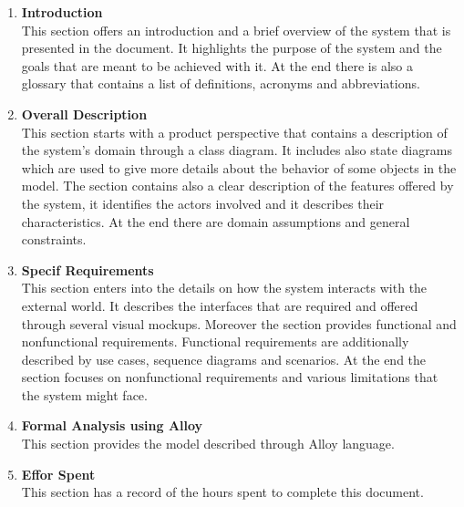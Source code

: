 \begin{enumerate}
    \item \textbf{Introduction}\\
            This section offers an introduction and a brief overview of the system that is presented in the document. 
            It highlights the purpose of the system and the goals that are meant to be achieved with it. 
            At the end there is also a glossary that contains a list of definitions, acronyms and abbreviations.
            
    \item \textbf{Overall Description}\\
            This section starts with a product perspective that contains a description of the system's domain through a class diagram. 
            It includes also state diagrams which are used to give more details about the behavior of some objects in the model.
            The section contains also a clear description of the features offered by the system, 
            it identifies the actors involved and it describes their characteristics.
            At the end there are domain assumptions and general constraints.
            
    
    \item \textbf{Specif Requirements}\\
            This section enters into the details on how the system interacts with the external world. It describes 
            the interfaces that are required and offered through several visual mockups. 
            Moreover the section provides functional and nonfunctional requirements. Functional
            requirements are additionally described by use cases, sequence diagrams and scenarios.
            At the end the section focuses on nonfunctional requirements and various limitations that the system might face.

    \item \textbf{Formal Analysis using Alloy}\\
            This section provides the model described through Alloy language.
            
    \item \textbf{Effor Spent}\\
            This section has a record of the hours spent to complete this document.

\end{enumerate}


